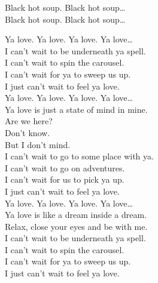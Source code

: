 Black hot soup. Black hot soup… \\
Black hot soup. Black hot soup… \\




Ya love. Ya love. Ya love. Ya love… \\

I can't wait to be underneath ya spell. \\
I can't wait to spin the carousel. \\
I can't wait for ya to sweep us up. \\
I just can't wait to feel ya love. \\

Ya love. Ya love. Ya love. Ya love… \\

Ya love is just a state of mind in mine. \\
Are we here? \\
Don't know. \\
But I don't mind. \\

I can't wait to go to some place with ya. \\
I can't wait to go on adventures. \\
I can't wait for us to pick ya up. \\
I just can't wait to feel ya love. \\

Ya love. Ya love. Ya love. Ya love… \\

Ya love is like a dream inside a dream. \\
Relax, close your eyes and be with me. \\

I can't wait to be underneath ya spell. \\
I can't wait to spin the carousel. \\
I can't wait for ya to sweep us up. \\
I just can't wait to feel ya love. \\




